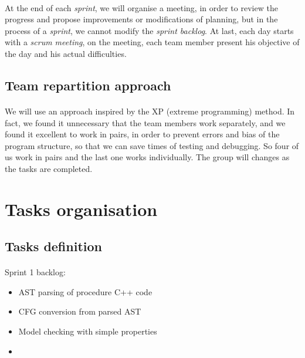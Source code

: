 \documentclass{report}
\begin{document}
\paragraph{}
\hspace{4mm}\textnormal{At the end of each \textit{sprint}, we will organise a meeting, in order to 
review the progress and propose improvements or modifications of planning,
 but in the process of a \textit{sprint}, we cannot modify the \textit{sprint backlog}. 
At last, each day starts with a \textit{scrum meeting}, on the meeting, each 
team member present his objective of the day and his actual difficulties.}

\subsection{Team repartition approach}

\paragraph{}
\hspace{4mm}\textnormal{We will use an approach inspired by the XP (extreme programming) method. 
In fact, we found it unnecessary that the team members work separately, 
and we found it excellent to work in pairs, in order to prevent errors and bias 
of the program structure, so that we can save times of testing and debugging. 
So four of us work in pairs and the last one works individually. The group 
will changes as the tasks are completed.}

\section{Tasks organisation}

\subsection{Tasks definition}

\paragraph{}
\hspace{4mm}\textnormal{Sprint 1 backlog:}

\vspace{4mm}
\begin{itemize}
\item AST parsing of procedure C++ code\vspace{1mm}
\item CFG conversion from parsed AST\vspace{1mm}
\item Model checking with simple properties\vspace{1mm}
\item \vspace{1mm}
\end{itemize}
\end{document}

